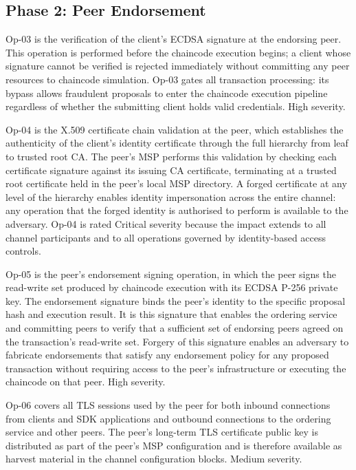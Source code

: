 \documentclass[conference]{IEEEtran}
\begin{document}
\subsection{Phase 2: Peer Endorsement}

Op-03 is the verification of the client's ECDSA signature at the
endorsing peer. This operation is performed before the chaincode execution
begins; a client whose signature cannot be verified is rejected immediately
without committing any peer resources to chaincode simulation. Op-03
gates all transaction processing: its bypass allows fraudulent proposals
to enter the chaincode execution pipeline regardless of whether the
submitting client holds valid credentials. High severity.

Op-04 is the X.509 certificate chain validation at the peer, which
establishes the authenticity of the client's identity certificate through
the full hierarchy from leaf to trusted root CA. The peer's MSP performs
this validation by checking each certificate signature against its
issuing CA certificate, terminating at a trusted root certificate held in
the peer's local MSP directory. A forged certificate at any level of the
hierarchy enables identity impersonation across the entire channel: any
operation that the forged identity is authorised to perform is available
to the adversary. Op-04 is rated Critical severity because the impact
extends to all channel participants and to all operations governed by
identity-based access controls.

Op-05 is the peer's endorsement signing operation, in which the peer
signs the read-write set produced by chaincode execution with its ECDSA
P-256 private key. The endorsement signature binds the peer's identity
to the specific proposal hash and execution result. It is this signature
that enables the ordering service and committing peers to verify that
a sufficient set of endorsing peers agreed on the transaction's read-write
set. Forgery of this signature enables an adversary to fabricate
endorsements that satisfy any endorsement policy for any proposed
transaction without requiring access to the peer's infrastructure or
executing the chaincode on that peer. High severity.

Op-06 covers all TLS sessions used by the peer for both inbound
connections from clients and SDK applications and outbound connections
to the ordering service and other peers. The peer's long-term TLS
certificate public key is distributed as part of the peer's MSP
configuration and is therefore available as harvest material in the
channel configuration blocks. Medium severity.
\end{document}
